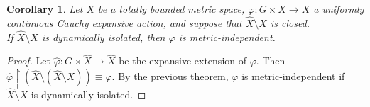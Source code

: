 \documentclass[12pt]{amsart}
\theoremstyle{plain}
\newtheorem{corollary}[theorem]{Corollary}
\theoremstyle{definition}
\theoremstyle{remark}
\begin{document}
\begin{corollary}
Let \(X\) be a totally bounded metric space, \(\varphi : G \times X \rightarrow X\) a uniformly continuous Cauchy expansive action, and suppose that \(\hat{X} \setminus X\) is closed.\\
If \(\hat{X} \setminus X\) is dynamically isolated, then \(\varphi\) is metric-independent.
\end{corollary}

\begin{proof}
Let \(\hat{\varphi} : G \times \hat{X} \rightarrow \hat{X}\) be the expansive extension of \(\varphi\). Then
\(\hat{\varphi} \upharpoonright (\hat{X} \setminus (\hat{X} \setminus X)) \equiv \varphi\). By the previous theorem, \(\varphi\) is metric-independent if \(\hat{X} \setminus X\) is dynamically isolated.
\end{proof}
\end{document}
